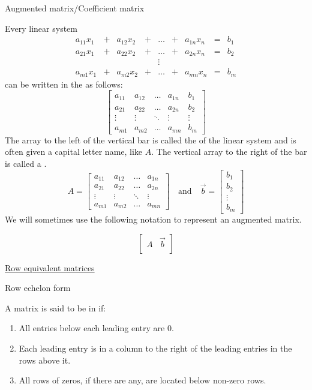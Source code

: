 \documentclass{ximera}
\begin{document}
Augmented matrix/Coefficient matrix
\begin{expandable}
    Every linear system 
$$\begin{array}{ccccccccc}
      a_{11}x_1 &+ &a_{12}x_2&+&\ldots&+&a_{1n}x_n&= &b_1 \\
	 a_{21}x_1 &+ &a_{22}x_2&+&\ldots&+&a_{2n}x_n&= &b_2 \\
     &&&&\vdots&&&& \\
     a_{m1}x_1 &+ &a_{m2}x_2&+&\ldots&+&a_{mn}x_n&= &b_m
    \end{array}$$
    can be written in the  as follows:
    $$\left[\begin{array}{cccc|c}  
 a_{11}&a_{12}&\ldots&a_{1n}&b_1\\a_{21}&a_{22}&\ldots&a_{2n}&b_2\\\vdots&\vdots&\ddots&\vdots&\vdots\\a_{m1}&a_{m2}&\ldots&a_{mn}&b_m
 \end{array}\right]$$
 The array to the left of the vertical bar is called the  of the linear system and is often given a capital letter name, like $A$.  The vertical array to the right of the bar is called a .
 $$A=\begin{bmatrix}a_{11}&a_{12}&\ldots&a_{1n}\\a_{21}&a_{22}&\ldots&a_{2n}\\\vdots&\vdots&\ddots&\vdots\\a_{m1}&a_{m2}&\ldots&a_{mn}\end{bmatrix}\quad\text{and}\quad\vec{b}=\begin{bmatrix}b_1\\b_2\\\vdots\\b_m\end{bmatrix}$$
We will sometimes use the following notation to represent an augmented matrix.

$$\left[\begin{array}{c|c}  
 A & \vec{b}\\
 \end{array}\right]$$
\end{expandable}

\href{https://ximera.osu.edu/oerlinalg/LinearAlgebra/SYS-0020/main}{Row equivalent matrices}

Row echelon form
\begin{expandable}
    A matrix is said to be in  if:
\begin{enumerate}
\item All entries below each leading entry are 0.
\item Each leading entry is in a column to the right of the leading entries in the rows above it.
\item All rows of zeros, if there are any, are located below non-zero rows.
\end{enumerate}
\end{expandable}
\end{document}
